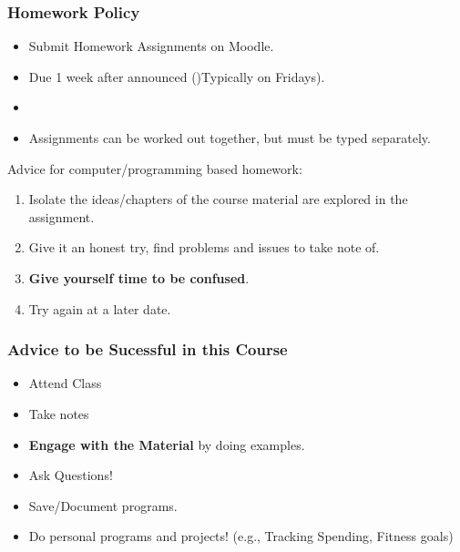 \documentclass[17pt]{beamer}
\begin{document}
	\begin{frame}
		\frametitle{Homework Policy}
		\begin{itemize}
			\item Submit Homework Assignments on Moodle.
			\item Due 1 week after announced ()Typically on Fridays). 
			\item \textbf{\color{red}{No Late Work is Accepted}}
			\item Assignments can be worked out together, but must be typed separately.
		\end{itemize}
	\end{frame}
	\begin{frame}
		Advice for computer/programming based homework:
		\begin{enumerate}
			\item Isolate the ideas/chapters of the course material are explored in the assignment.
			\item Give it an honest try, find problems and issues to take note of.
			\item \textbf{Give yourself time to be confused}. 
			\item Try again at a later date.  
		\end{enumerate}
	\end{frame}
	\begin{frame}
		\frametitle{Advice to be Sucessful in this Course}
		\begin{itemize}
			\item Attend Class
			\item Take notes
			\item \textbf{Engage with the Material} by doing examples.
			\item Ask Questions!
			\item Save/Document programs.
			\item Do personal programs and projects! (e.g., Tracking Spending, Fitness goals)
		\end{itemize}
	\end{frame}
\end{document}
